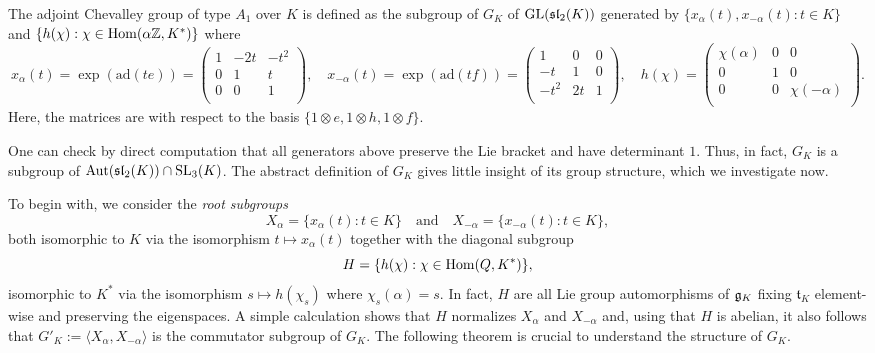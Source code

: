 \begin{definition}
    The adjoint Chevalley group of type $A_1$ over $K$ is defined as the subgroup of $G_K$ of $\mathrm{GL}(\mathfrak{sl}_2(K))$ generated by $\{x_\alpha(t),x_{-\alpha}(t):t\in K\}$ and $\{h(\chi):\chi\in\mathrm{Hom}(\alpha\mathbb{Z},K^*)\}$ where
    $$x_\alpha(t)=\exp(\mathrm{ad}(te))=\begin{pmatrix}
        1 & -2t & -t^2\\
        0 & 1 & t\\
        0 & 0 & 1\\
    \end{pmatrix},\quad x_{-\alpha}(t)=\exp(\mathrm{ad}(tf))=\begin{pmatrix}
        1 & 0 & 0\\
        -t & 1 & 0\\
        -t^2 & 2t & 1\\
    \end{pmatrix},\quad h(\chi)=\begin{pmatrix}
        \chi(\alpha) & 0 & 0\\
        0 & 1 & 0\\
        0 & 0 & \chi(-\alpha)\\
    \end{pmatrix}.$$
    Here, the matrices are with respect to the basis $\{1\otimes e,1\otimes h,1\otimes f\}$.
\end{definition}

One can check by direct computation that all generators above preserve the Lie bracket and have determinant $1$. Thus, in fact, $G_K$ is a subgroup of $\mathrm{Aut}(\mathfrak{sl}_2(K))\cap\mathrm{SL}_3(K)$. The abstract definition of $G_K$ gives little insight of its group structure, which we investigate now.  

To begin with, we consider the \textit{root subgroups}
$$X_\alpha=\{x_\alpha(t):t\in K\}\quad\text{and}\quad X_{-\alpha}=\{x_{-\alpha}(t):t\in K\},$$
both isomorphic to $K$ via the isomorphism $t\mapsto x_\alpha(t)$
together with the diagonal subgroup 
$$H=\{h(\chi):\chi\in\mathrm{Hom}(Q,K^*)\},$$
isomorphic to $K^*$ via the isomorphism $s\mapsto h(\chi_s)$ where $\chi_s(\alpha)=s$.
In fact, $H$ are all Lie group automorphisms of $\mathfrak{g}_K$ fixing $\mathfrak{t}_K$ element-wise and preserving the eigenspaces. A simple calculation shows that $H$ normalizes $X_\alpha$ and $X_{-\alpha}$ and, using that $H$ is abelian, it also follows that $G'_K:=\langle X_\alpha,X_{-\alpha}\rangle$ is the commutator subgroup of $G_K$. The following theorem is crucial to understand the structure of $G_K$.

